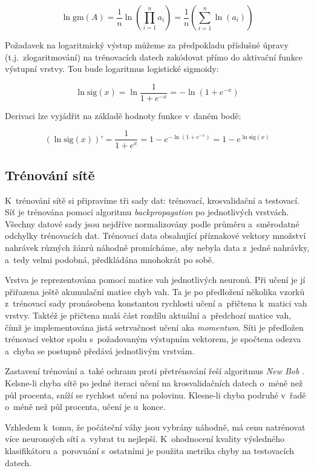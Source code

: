 \documentclass[10pt,a4paper]{article}
\begin{document}
$$
\ln\mbox{gm}(A)
= \frac{1}{n}\ln\left(\prod_{i=1}^na_i\right)
= \frac{1}{n}\left(\sum_{i=1}^n\ln(a_i)\right)
$$

Požadavek na logaritmický výstup můžeme za předpokladu příslušné úpravy (t.j.~zlogaritmování)
na trénovacích datech zakódovat přímo do aktivační funkce výstupní vrstvy.
Tou bude logaritmus logistické sigmoidy:

$$ \ln\mbox{sig}(x) = \ln\frac{1}{1+e^{-x}} = -\ln(1 + e^{-x}) $$

Derivaci lze vyjádřit na základě hodnoty funkce v~daném bodě:

$$ (\ln\mbox{sig}(x))' = \frac{1}{1+e^{x}} = 1-e^{-\ln(1 + e^{-x})} = 1 - e^{\ln\mathrm{sig}(x)} $$

\subsection{Trénování sítě}

K~trénování sítě si připravíme tři sady dat: trénovací, krosvalidační a testovací.
Síť je trénována pomocí algoritmu \emph{backpropagation} po jednotlivých vrstvách.
Všechny datové sady jsou nejdříve normalizovány podle průměru a~směrodatné odchylky
trénovacích dat. Trénovací data obsahující příznakové vektory množství nahrávek různých
žánrů náhodně promícháme, aby nebyla data z~jedné nahrávky, a~tedy velmi podobná,
předkládána mnohokrát po sobě.

Vrstva je reprezentována pomocí matice vah jednotlivých neuronů.
Při učení je jí přiřazena ještě akumulační matice chyb vah.
Ta je po předložení několika vzorků z~trénovací sady
pronásobena konstantou rychlosti učení a~přičtena k~matici vah vrstvy.
Taktéž je přičtena malá část rozdílu aktuální a~předchozí matice vah,
čímž je implementována jistá setrvačnost učení aka \emph{momentum}.
Síti je předložen trénovací vektor spolu s~požadovaným výstupním vektorem,
je spočtena odezva a~chyba se postupně předává jednotlivým vrstvám.

Zastavení trénování a~také ochranu proti přetrénování řeší algoritmus \emph{New Bob} \cite{newbob}.
Kelsne-li chyba sítě po jedné iteraci učení na krosvalidačních datech o~méně než půl procenta,
sníží se rychlost učení na polovinu. Klesne-li chyba podruhé v~řadě o~méně než půl procenta,
učení je u~konce.

Vzhledem k~tomu, že počáteční váhy jsou vybrány náhodně,
má cenu natrénovat více neuronoých sítí a~vybrat tu nejlepší.
K~ohodnocení kvality výsledného klasifikátoru a~porovnání s~ostatními
je použita metrika chyby na testovacích datech.
\end{document}
